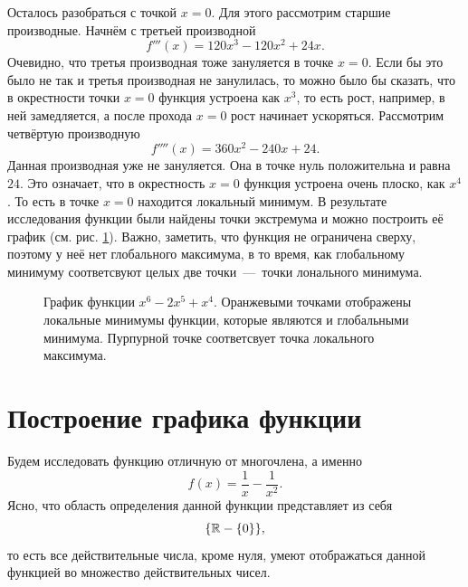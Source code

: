 \documentclass[12pt]{article}
\begin{document}
\par Осталось разобраться с точкой $x=0$. Для этого рассмотрим старшие производные. Начнём с третьей производной
\begin{equation}
	f'''(x) = 120 x^3 - 120x^2 + 24x.
\end{equation}
Очевидно, что третья производная тоже зануляется в точке $x=0$. Если бы это было не так и третья производная не занулилась, то можно было бы сказать, что в окрестности точки $x=0$ функция устроена как $x^3$, то есть рост, например, в ней замедляется, а после прохода $x=0$ рост начинает ускоряться. Рассмотрим четвёртую производную
\begin{equation}
	f''''(x) = 360x^2-240x+24.
\end{equation}
Данная производная уже не зануляется. Она в точке нуль положительна и равна $24$. Это означает, что в окрестность $x=0$ функция устроена очень плоско, как $x^4$. То есть в точке $x=0$ находится локальный минимум. В результате исследования функции были найдены точки экстремума и можно построить её график (см. рис. \ref{fig:74}). Важно, заметить, что функция не ограничена сверху, поэтому у неё нет глобального максимума, в то время, как глобальному минимуму соответсвуют целых две точки~\----~точки лонального минимума. 

\begin{figure}[htbp]
	\centering
	\caption{График функции $x^6-2x^5+x^4$. Оранжевыми точками отображены локальные минимумы функции, которые являются и глобальными минимума. Пурпурной точке соответсвует точка локального максимума.}
	\label{fig:74}
\end{figure}

\section{Построение графика функции} %
Будем исследовать функцию отличную от многочлена, а именно
\begin{equation}
	f(x) = \dfrac{1}{x} - \dfrac{1}{x^2}.
\end{equation}
Ясно, что область определения данной функции представляет из себя
\begin{equation}
	\qty{\mathbb{R} - \qty{0}},
\end{equation}
то есть все действительные числа, кроме нуля, умеют отображаться данной функцией во множество действительных чисел.
\end{document}
